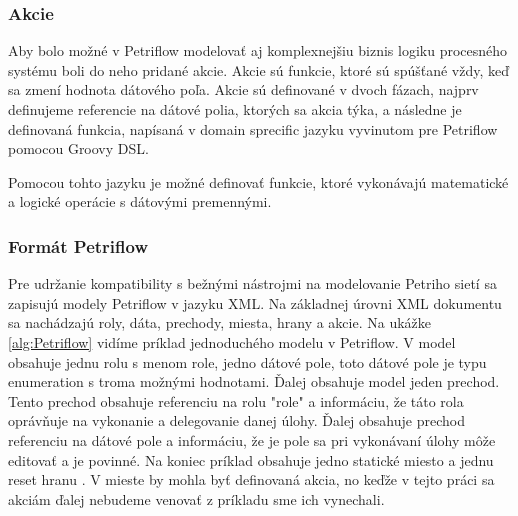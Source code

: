 \subsubsection{Akcie}
Aby bolo možné v Petriflow modelovať aj komplexnejšiu biznis logiku procesného systému boli do neho pridané akcie. Akcie sú funkcie, ktoré sú spúšťané vždy, keď sa zmení hodnota dátového poľa. Akcie sú definované v dvoch fázach, najprv definujeme referencie na dátové polia, ktorých sa akcia týka, a následne je definovaná funkcia, napísaná v domain sprecific jazyku vyvinutom pre Petriflow pomocou Groovy DSL. 

Pomocou tohto jazyku je možné definovať funkcie, ktoré vykonávajú matematické a logické operácie s dátovými premennými. 

\subsubsection{Formát Petriflow}
Pre udržanie kompatibility s bežnými nástrojmi na modelovanie Petriho sietí sa zapisujú modely Petriflow v jazyku XML. Na základnej úrovni XML dokumentu sa nachádzajú roly, dáta, prechody, miesta, hrany a akcie. Na ukážke \ref{alg:Petriflow} vidíme príklad jednoduchého modelu v Petriflow. 
V model obsahuje jednu rolu s menom role, 
jedno dátové pole, toto dátové pole je typu enumeration s troma možnými hodnotami. 
Ďalej obsahuje model jeden prechod. Tento prechod obsahuje referenciu na rolu "role" a informáciu, že táto rola oprávňuje na vykonanie a delegovanie danej úlohy. Ďalej obsahuje prechod referenciu na dátové pole a informáciu, že je pole sa pri vykonávaní úlohy môže editovať a je povinné.
Na koniec príklad obsahuje jedno statické miesto a jednu reset hranu . V mieste by mohla byť definovaná akcia, no keďže v tejto práci sa akciám ďalej nebudeme venovať z príkladu sme ich vynechali.

